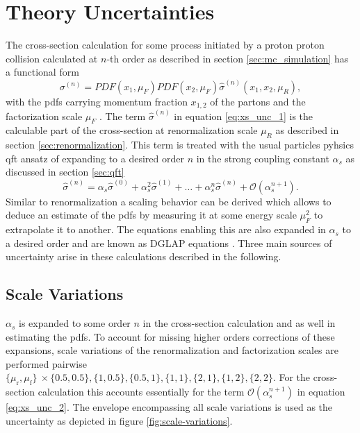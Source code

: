 \section{Theory Uncertainties}\label{sec:theory_uncertainties}
The cross-section calculation for some process initiated by a proton proton collision calculated at $n$-th order as described in section \ref{sec:mc_simulation} has a functional form
\begin{equation}
    \sigma^{(n)} = PDF(x_1, \mu_F)  PDF(x_2, \mu_F) \hat{\sigma}^{(n)}(x_1,x_2,\mu_R),
    \label{eq:xs_unc_1}
\end{equation}
with the \acfp{pdf} carrying momentum fraction $x_{1,2}$ of the partons and the factorization scale $\mu_F$ \citep{unc_recipe}. The term $\hat{\sigma}^{(n)}$ in equation \ref{eq:xs_unc_1} is the calculable part of the cross-section at renormalization scale $\mu_R$ as described in section \ref{sec:renormalization}. This term is treated with the usual particles pyhsics \ac{qft} ansatz of expanding to a desired order $n$ in the strong coupling constant $\alpha_s$ as discussed in section \ref{sec:qft}
\begin{equation}
    \hat{\sigma}^{(n)} = \alpha_s \hat{\sigma}^{(0)} + \alpha_s^2 \hat{\sigma}^{(1)} + \ldots + \alpha_s^n \hat{\sigma}^{(n)} + \mathcal{O}(\alpha_s^{n+1}).
    \label{eq:xs_unc_2}
\end{equation}
Similar to renormalization a scaling behavior can be derived which allows to deduce an estimate of the \acp{pdf} by measuring it at some energy scale $\mu_F^2$ to extrapolate it to another. The equations enabling this are also expanded in $\alpha_s$ to a desired order and are known as DGLAP equations \citep{halzen1984introductory}. Three main sources of uncertainty arise in these calculations described in the following.

\subsection{Scale Variations}
$\alpha_s$ is expanded to some order $n$ in the cross-section calculation and as well in estimating the \acp{pdf}. To account for missing higher orders corrections of these expansions, scale variations of the renormalization and factorization scales are performed pairwise $\{\mu_\text{r},\mu_\text{f}\}\ \times \{0.5,0.5\}, \{1,0.5\}, \{0.5,1\}, \{1,1\}, \{2,1\}, \{1,2\}, \{2,2\}$. For the cross-section calculation this accounts essentially for the term $\mathcal{O}(\alpha_s^{n+1})$ in equation \ref{eq:xs_unc_2}. The envelope encompassing all scale variations is used as the uncertainty as depicted in figure \ref{fig:scale-variations}.


